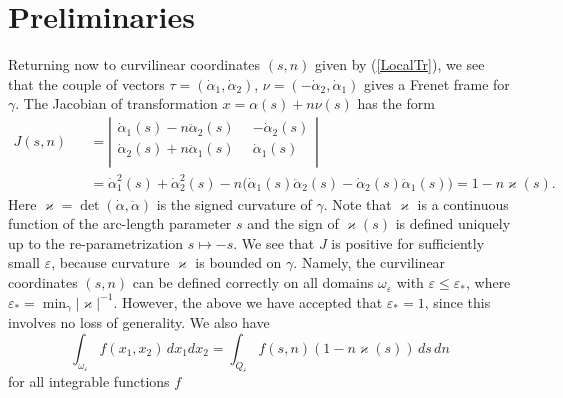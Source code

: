 \documentclass[graybox]{svmult}
\renewcommand{\kappa}{\varkappa}
\newcommand{\eps}{\varepsilon}
\renewcommand{\leq}{\leqslant}
\newcommand{\eqref}[1]{(\ref{#1})}
\begin{document}

\section{Preliminaries}


Returning now to curvilinear coordinates $(s,n)$ given by \eqref{LocalTr},
we see that the couple of vectors
$ \tau=(\dot{\alpha}_1, \dot{\alpha}_2)$, $\nu=(-\dot{\alpha}_2, \dot{\alpha}_1)$
gives a Frenet frame for $\gamma$.
The Jacobian of transformation $x=\alpha(s)+n\nu(s)$ has the form
\begin{eqnarray}\nonumber
J(s,n)&&=
\left|
        \begin{array}{cr}
          \dot{\alpha}_1(s)-n\ddot{\alpha}_2(s)\phantom{0} &  -\dot{\alpha}_2(s)\\
          \dot{\alpha}_2(s)+n\ddot{\alpha}_1(s)\phantom{0} & \dot{\alpha}_1(s)\\
        \end{array}
      \right|\\\nonumber
&&=\dot{\alpha}_1^2(s)+\dot{\alpha}_2^2(s)
-n\big(\dot{\alpha}_1(s)\ddot{\alpha}_2(s)-
  \dot{\alpha}_2(s)\ddot{\alpha}_1(s)\big)=1-n \kappa(s).
\end{eqnarray}
Here $\kappa=\det(\dot{\alpha},\ddot{\alpha})$ is the signed curvature of $\gamma$. Note that $\kappa$ is a continuous function
of the arc-length parameter $s$ and the sign of $\kappa(s)$ is defined uniquely up to the re-parametrization $s\mapsto-s$.
We see that $J$ is positive for sufficiently small $\eps$, because  curvature $\kappa$  is  bounded on $\gamma$.
Namely, the curvilinear coordinates $(s,n)$ can be defined correctly on all domains $\omega_\eps$ with $\eps\leq \eps_*$, where
$\eps_*=\min_{\gamma}|\kappa|^{-1}$.
However, the above we have accepted that $\eps_*=1$, since this
involves no loss of generality. We also have
\begin{equation}\label{IntegralCh}
  \int_{\omega_\eps} f(x_1,x_2)\,dx_1dx_2=\int_{Q_\eps} f(s,n)(1-n\kappa(s))\,ds\,dn
\end{equation}
for all integrable functions $f$
\end{document}
